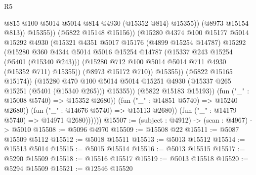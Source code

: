 \begin{lexlean}{R5}
\begin{coremodule}
                                        @815
                                        @100
                                        @5014
                                        @5014
                                        @814
                                        @4930
                                        (@15352 @814)
                                        @15355))
                                    (@8973 @15154 @813))
                                  @15355))
                              (@5822 @15148 @15156))
                            (@15280
                              @4374
                              @100
                              @15177
                              @5014
                              @15292
                              @4930
                              (@15321
                                @4351
                                @5017
                                @15176
                                (@4899 @15254 @14787)
                                @15292
                                (@15280
                                  @360
                                  @4344
                                  @5014
                                  @5016
                                  @15254
                                  @14787
                                  (@15337 @243 @15254 (@5401 (@15340 @243)))
                                  (@15280 @712 @100 @5014 @5014 @711 @4930 (@15352 @711) @15355))
                                (@8973 @15172 @710))
                              @15355))
                          (@5822 @15165 @15174))
                        (@15280
                          @470
                          @100
                          @5014
                          @5014
                          @15251
                          @4930
                          (@15337 @265 @15251 (@5401 (@15340 @265)))
                          @15355))
                      (@5822 @15183 @15193))
                    (fun ("_" : @15008 @5740) => @15352 @2680))
                  (fun ("_" : @14851 @5740) => @15240 @2680))
                (fun ("_" : @14676 @5740) => @15113 @2680))
              (fun ("_" : @14179 @5740) => @14971 @2680))))))
@15507 := (subject : @4912) -> (scan : @4967) -> @5010
@15508 := @5096 @4970
@15509 := @15508 @22
@15511 := @5087 @15509 @5112
@15512 := @5018 @15511
@15513 := @5013 @15512
@15514 := @15513 @5014
@15515 := @5015 @15514
@15516 := @5013 @15515
@15517 := @5290 @15509
@15518 := @15516 @15517
@15519 := @5013 @15518
@15520 := @5294 @15509
@15521 := @12546 @15520

\end{coremodule}
\end{lexlean}
